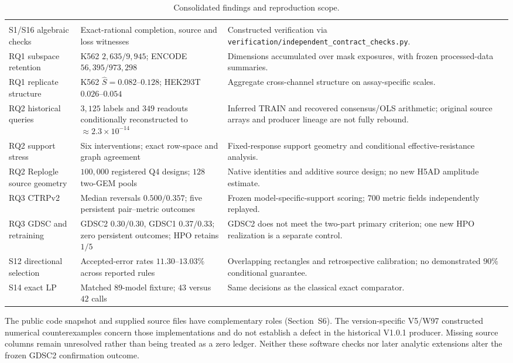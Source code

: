 \begin{longtable}{@{}L{0.20\textwidth}L{0.35\textwidth}L{0.36\textwidth}@{}}
\caption{Consolidated findings and reproduction scope.}\label{tab:evidence-ledger}\\
\toprule {} &  & \\\midrule\endfirsthead
\toprule {} &  & \\\midrule\endhead
S1/S16 algebraic checks & Exact-rational completion, source and loss witnesses & Constructed verification via \nolinkurl{verification/independent_contract_checks.py}.\\
RQ1 subspace retention & K562 $2{,}635/9{,}945$; ENCODE $56{,}395/973{,}298$ & Dimensions accumulated over mask exposures, with frozen processed-data summaries.\\
RQ1 replicate structure & K562 $\widehat S=0.082$--$0.128$; HEK293T $0.026$--$0.054$ & Aggregate cross-channel structure on assay-specific scales.\\
RQ2 historical queries & $3{,}125$ labels and $349$ readouts conditionally reconstructed to $\approx2.3\times10^{-14}$ & Inferred TRAIN and recovered consensus/OLS arithmetic; original source arrays and producer lineage are not fully rebound.\\
RQ2 support stress & Six interventions; exact row-space and graph agreement & Fixed-response support geometry and conditional effective-resistance analysis.\\
RQ2 Replogle source geometry & $100{,}000$ registered Q4 designs; $128$ two-GEM pools & Native identities and additive source design; no new H5AD amplitude estimate.\\
RQ3 CTRPv2 & Median reversals $0.500/0.357$; five persistent pair--metric outcomes & Frozen model-specific-support scoring; $700$ metric fields independently replayed.\\
RQ3 GDSC and retraining & GDSC2 $0.30/0.30$, GDSC1 $0.37/0.33$; zero persistent outcomes; HPO retains $1/5$ & GDSC2 does not meet the two-part primary criterion; one new HPO realization is a separate control.\\
S12 directional selection & Accepted-error rates $11.30$--$13.03\%$ across reported rules & Overlapping rectangles and retrospective calibration; no demonstrated $90\%$ conditional guarantee.\\
S14 exact LP & Matched $89$-model fixture; $43$ versus $42$ calls & Same decisions as the classical exact comparator.\\\bottomrule
\end{longtable}
The public code snapshot and supplied source files have complementary roles (Section~S6). The version-specific V5/W97 constructed numerical counterexamples concern those implementations and do not establish a defect in the historical V1.0.1 producer. Missing source columns remain unresolved rather than being treated as a zero ledger. Neither these software checks nor later analytic extensions alter the frozen GDSC2 confirmation outcome.
